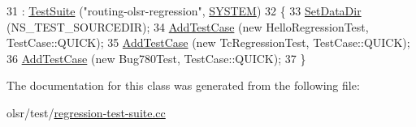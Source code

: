 \begin{DoxyCode}
31                          : \hyperlink{classns3_1_1TestSuite_a904b0c40583b744d30908aeb94636d1a}{TestSuite} (\textcolor{stringliteral}{"routing-olsr-regression"}, \hyperlink{classns3_1_1TestSuite_a1ebfcab34ec8161e085e8e3a1855eae0a90c5529a26ab3a5ffcc6e57040dbd82e}{SYSTEM})
32   \{
33     \hyperlink{classns3_1_1TestCase_ab002fb0e5071fcde71a92ca9e8224b23}{SetDataDir} (NS\_TEST\_SOURCEDIR);
34     \hyperlink{classns3_1_1TestCase_a3718088e3eefd5d6454569d2e0ddd835}{AddTestCase} (\textcolor{keyword}{new} HelloRegressionTest, TestCase::QUICK);
35     \hyperlink{classns3_1_1TestCase_a3718088e3eefd5d6454569d2e0ddd835}{AddTestCase} (\textcolor{keyword}{new} TcRegressionTest, TestCase::QUICK);
36     \hyperlink{classns3_1_1TestCase_a3718088e3eefd5d6454569d2e0ddd835}{AddTestCase} (\textcolor{keyword}{new} Bug780Test, TestCase::QUICK);
37   \}
\end{DoxyCode}


The documentation for this class was generated from the following file\+:\begin{DoxyCompactItemize}
\item 
olsr/test/\hyperlink{regression-test-suite_8cc}{regression-\/test-\/suite.\+cc}\end{DoxyCompactItemize}
